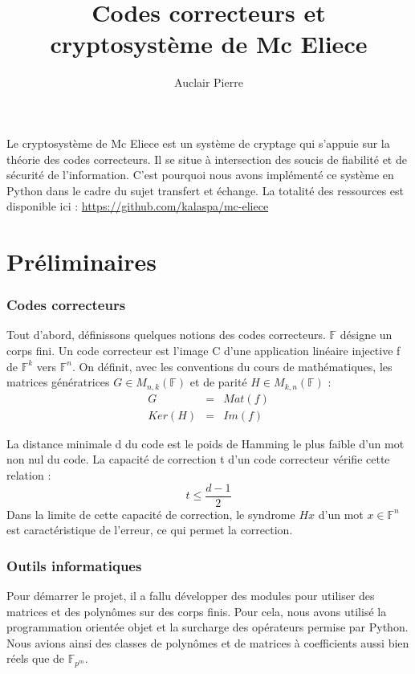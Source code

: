 \documentclass{article}
\title{Codes correcteurs et cryptosystème de Mc Eliece}
\author{Auclair Pierre}
\begin{document}
	\maketitle

	Le cryptosystème de Mc Eliece est un système de cryptage qui s'appuie sur la théorie des codes correcteurs.
	Il se situe à intersection des soucis de fiabilité et de sécurité de l'information.
	C'est pourquoi nous avons implémenté ce système en Python dans le cadre du sujet transfert et échange.
	La totalité des ressources est disponible ici : \url{https://github.com/kalaspa/mc-eliece}


	\part*{Préliminaires}

		\section*{Codes correcteurs}
			\cite{04cc}
			Tout d'abord, définissons quelques notions des codes correcteurs.
			$\mathbb{F}$ désigne un corps fini.
			Un code correcteur est l'image C d'une application linéaire injective f de $\mathbb{F}^{k}$ vers $\mathbb{F}^{n}$.
			On définit, avec les conventions du cours de mathématiques, les matrices génératrices $G \in M_{n,k}(\mathbb{F})$ et de parité $H\in M_{k,n}(\mathbb{F})$ :
			\begin{eqnarray*}
				G &=& Mat(f) \\
				Ker(H) &=& Im(f)
			\end{eqnarray*}

			La distance minimale d du code est le poids de Hamming le plus faible d'un mot non nul du code.
			La capacité de correction t d'un code correcteur vérifie cette relation :
			$$
				t \leq \frac{d-1}{2}
			$$
			Dans la limite de cette capacité de correction, le syndrome $Hx$ d'un mot $x \in \mathbb{F}^{n}$ est caractéristique de l'erreur, ce qui permet la correction.

		\section*{Outils informatiques}
			Pour démarrer le projet, il a fallu développer des modules pour utiliser des matrices et des polynômes sur des corps finis.
			Pour cela, nous avons utilisé la programmation orientée objet et la surcharge des opérateurs permise par Python.
			Nous avions ainsi des classes de polynômes et de matrices à coefficients aussi bien réels que de $\mathbb{F}_{p^{m}}$.
\end{document}
